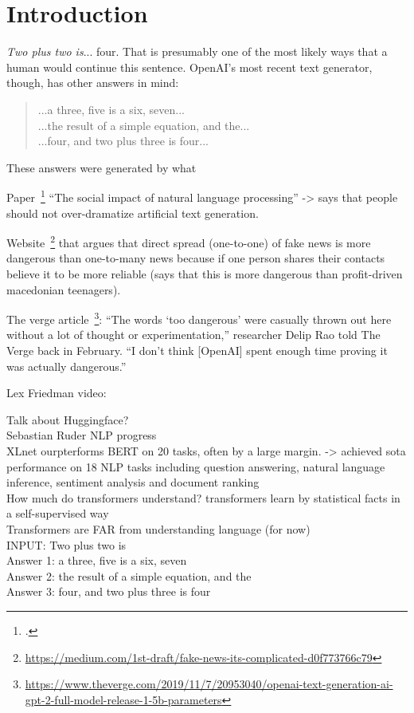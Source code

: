 \section{Introduction}
\label{ch:introduction}

\textit{Two plus two is}... four. That is presumably one of the most likely ways that a human would continue this sentence. OpenAI's most recent text generator, though, has other answers in mind:
\begin{quote}
	...a three, five is a six, seven... \\
	...the result of a simple equation, and the... \\
	...four, and two plus three is four...
\end{quote}
These answers were generated by what 

Paper~\footcite{hovy-spruit-2016-social} ``The social impact of natural language processing'' -> says that people should not over-dramatize artificial text generation.

Website~\footnote{\url{https://medium.com/1st-draft/fake-news-its-complicated-d0f773766c79}} that argues that direct spread (one-to-one) of fake news is more dangerous than one-to-many news because if one person shares their contacts believe it to be more reliable (says that this is more dangerous than profit-driven macedonian teenagers).

The verge article~\footnote{\url{https://www.theverge.com/2019/11/7/20953040/openai-text-generation-ai-gpt-2-full-model-release-1-5b-parameters}}: “The words ‘too dangerous’ were casually thrown out here without a lot of thought or experimentation,” researcher Delip Rao told The Verge back in February. “I don’t think [OpenAI] spent enough time proving it was actually dangerous.”

Lex Friedman video: 

Talk about Huggingface? \\
Sebastian Ruder NLP progress \\
XLnet ourpterforms BERT on 20 tasks, often by a large margin. -> achieved sota performance on 18 NLP tasks including question answering, natural language inference, sentiment analysis and document ranking \\
How much do transformers understand? transformers learn by statistical facts in a self-supervised way \\
Transformers are FAR from understanding language (for now) \\
INPUT: Two plus two is \\
Answer 1: a three, five is a six, seven \\
Answer 2: the result of a simple equation, and the \\
Answer 3: four, and two plus three is four \\

